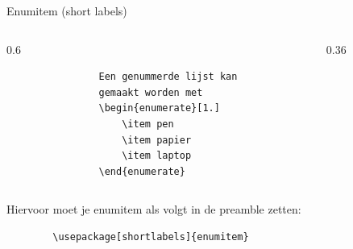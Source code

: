 \begin{frame}[fragile, t]{Enumitem (short labels)}
	\begin{columns}[t]
		\begin{column}{0.6\textwidth}
			\begin{verbatim}
				Een genummerde lijst kan 
				gemaakt worden met
				\begin{enumerate}[1.]
					\item pen
					\item papier
					\item laptop
				\end{enumerate}
			\end{verbatim}
			\par
		\end{column}
		
		\begin{column}{0.36\textwidth}
			\vspace{1mm}
		\end{column}
	\end{columns}
	\vspace{1cm}
	Hiervoor moet je enumitem als volgt in de preamble zetten: \begin{verbatim}
		\usepackage[shortlabels]{enumitem}
	\end{verbatim}
\end{frame}

